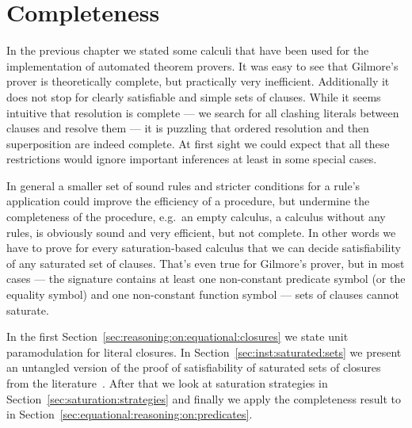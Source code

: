 
\chapter{Completeness}\label{chapter:completeness}

In the previous chapter we stated some calculi
that have been used for the implementation
of automated theorem provers.
%
It was easy to see that Gilmore's prover is theoretically complete,
but practically very inefficient.
Additionally it does not stop for clearly satisfiable and simple sets of clauses.
While it seems intuitive that resolution is complete
--- we search for all clashing literals between clauses and resolve them ---
it is puzzling that ordered resolution and then superposition are indeed complete.
At first sight we could expect that all these restrictions
would ignore important inferences at least in some special cases.

In general a smaller set of sound rules
and stricter conditions for a rule's application
could improve the efficiency of a procedure,
but undermine the completeness
of the procedure, e.g.~an empty calculus,
a calculus without any rules,
is obviously sound and very efficient, but not complete.
%
In other words we have to prove for every saturation-based calculus
that we can decide satisfiability of any saturated set of clauses.
That's even true for Gilmore's prover, but in most cases
---
the signature contains at least one non-constant predicate symbol
(or the equality symbol)
and one non-constant function symbol
---
sets of clauses cannot saturate.








In the first Section~\vref{sec:reasoning:on:equational:closures}
we state unit paramodulation for literal closures.
In Section~\vref{sec:inst:saturated:sets} we present
an untangled version of the proof of satisfiability
of saturated sets of closures
from the literature~\cite{GK2004csl}.
After that we look at saturation strategies in
Section~\vref{sec:saturation:strategies}
and finally we apply the completeness result to \InstGenEQ{}
in Section~\vref{sec:equational:reasoning:on:predicates}.

